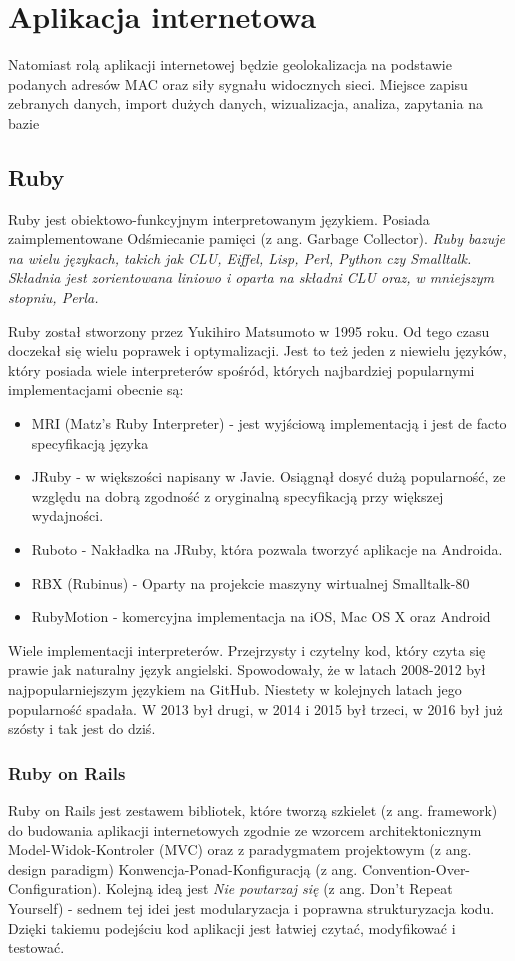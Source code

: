 \section{Aplikacja internetowa}
Natomiast rolą aplikacji internetowej będzie geolokalizacja na podstawie podanych adresów MAC oraz siły sygnału widocznych sieci. Miejsce zapisu zebranych danych, import dużych danych, wizualizacja, analiza, zapytania na bazie

\subsection{Ruby}
Ruby jest obiektowo-funkcyjnym interpretowanym językiem. Posiada zaimplementowane Odśmiecanie pamięci (z ang. Garbage Collector). \textit{Ruby bazuje na wielu językach, takich jak CLU, Eiffel, Lisp, Perl, Python czy Smalltalk. Składnia jest zorientowana liniowo i oparta na składni CLU oraz, w mniejszym stopniu, Perla.}\cite{RubyWiki}

Ruby został stworzony przez Yukihiro Matsumoto w 1995 roku. Od tego czasu doczekał się wielu poprawek i optymalizacji. Jest to też jeden z niewielu języków, który posiada wiele interpreterów spośród, których najbardziej popularnymi implementacjami obecnie są:
\begin{itemize}
    \item MRI (Matz's Ruby Interpreter) - jest wyjściową implementacją i jest de facto specyfikacją języka
    \item JRuby - w większości napisany w Javie. Osiągnął dosyć dużą popularność, ze względu na dobrą zgodność z oryginalną specyfikacją przy większej wydajności.
    \item Ruboto - Nakładka na JRuby, która pozwala tworzyć aplikacje na Androida.
    \item RBX (Rubinus) - Oparty na projekcie maszyny wirtualnej Smalltalk-80
    \item RubyMotion - komercyjna implementacja na iOS, Mac OS X oraz Android
\end{itemize}

Wiele implementacji interpreterów. Przejrzysty i czytelny kod, który czyta się prawie jak naturalny język angielski. Spowodowały, że w latach 2008-2012 był najpopularniejszym językiem na GitHub.\cite{RubyStats2015} Niestety w kolejnych latach jego popularność spadała. W 2013 był drugi, w 2014 i 2015 był trzeci\cite{RubyStats2015}, w 2016 był już szósty i tak jest do dziś.\cite{GithutStats2017}

\subsubsection{Ruby on Rails}
Ruby on Rails jest zestawem bibliotek, które tworzą szkielet (z ang. framework) do budowania aplikacji internetowych zgodnie ze wzorcem architektonicznym Model-Widok-Kontroler (MVC) oraz z paradygmatem projektowym (z ang. design paradigm) Konwencja-Ponad-Konfiguracją (z ang. Convention-Over-Configuration). Kolejną ideą jest \textit{Nie powtarzaj się} (z ang. Don't Repeat Yourself) - sednem tej idei jest modularyzacja i poprawna strukturyzacja kodu. Dzięki takiemu podejściu kod aplikacji jest łatwiej czytać, modyfikować i testować.

